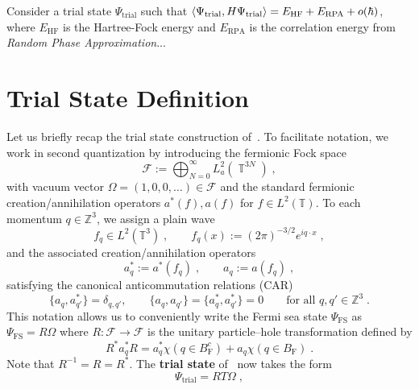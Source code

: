 \documentclass[12pt,a4paper]{article}
\numberwithin{equation}{section}
\newcommand{\cF}{\mathcal{F}}
\newcommand{\TTT}{\mathbb{T}}
\newcommand{\ZZZ}{\mathbb{Z}}
\newcommand{\1}{\mathbb{I}}
\newcommand{\F}{\mathrm{F}}
\newcommand{\FS}{\mathrm{FS}}
\newcommand{\trial}{\mathrm{trial}}
\DeclareMathOperator{\T}{\mathbb{T}}
\theoremstyle{plain}
\theoremstyle{definition}
\theoremstyle{remark}
\theoremstyle{plain}
\theoremstyle{definition}
\theoremstyle{remark}
\begin{document}
Consider a trial state $\Psi_{\mathrm{trial}}$ such that $\braket{\Psi_{\mathrm{trial}},H\Psi_{\mathrm{trial}}} = E_{\mathrm{HF}} + E_{\mathrm{RPA}}+ o(\hbar) $, where $E_{\mathrm{HF}}$ is the Hartree-Fock energy and $E_{\mathrm{RPA}}$ is the correlation energy from \textit{Random Phase Approximation}...




\section{Trial State Definition}
\label{sec:trialstate}

Let us briefly recap the trial state construction of~\cite{CHN???}. To facilitate notation, we work in second quantization by introducing the fermionic Fock space
\begin{equation}
	\cF := \bigoplus_{N=0}^\infty L^2_a(\T^{3N}) \;,
\end{equation}
with vacuum vector $ \Omega = (1,0,0,\ldots) \in \cF $ and the standard fermionic creation/annihilation operators $ a^*(f), a(f) $ for $ f \in L^2(\TTT) $. To each momentum $ q \in \ZZZ^3 $, we assign a plain wave
\begin{equation}
	f_q \in L^2(\TTT^3) \;, \qquad
	f_q(x) := (2 \pi)^{-3/2} e^{i q \cdot x} \;,
\end{equation}
and the associated creation/annihilation operators
\begin{equation}
	a^*_q := a^*(f_q) \;, \qquad
	a_q := a(f_q) \;,
\end{equation}
satisfying the canonical anticommutation relations (CAR)
\begin{equation} \label{eq:CAR}
	\{a_q, a_{q'}^*\} = \delta_{q, q'}, \qquad
	\{a_q, a_{q'}\} = \{a_q^*, a_{q'}^*\} = 0 \qquad \text{for all } q, q' \in \ZZZ^3\;.
\end{equation}
This notation allows us to conveniently write the Fermi sea state $ \Psi_{\FS} $ as $ \Psi_{\FS} = R \Omega $ where $ R: \cF \to \cF $ is the unitary particle--hole transformation defined by
\begin{equation} \label{eq:R}
	R^* a_q^* R
	= a_q^* \chi(q \in B_{\F}^c) + a_q \chi(q \in B_{\F}) \;.
\end{equation}
Note that $ R^{-1} = R = R^* $. The \textbf{trial state} of~\cite{CHN23} now takes the form
\begin{equation} \label{eq:Psitrial}
	\Psi_{\trial} = R T \Omega \;,
\end{equation}
\end{document}

